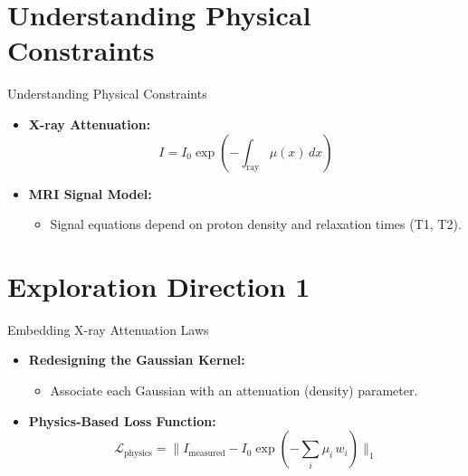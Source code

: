 \documentclass{beamer}
\begin{document}
\section{Understanding Physical Constraints}
\begin{frame}{Understanding Physical Constraints}
    \begin{itemize}
        \item \textbf{X-ray Attenuation:}
        \[
        I = I_0 \exp\left(-\int_{\text{ray}} \mu(x) \,dx\right)
        \]
        \item \textbf{MRI Signal Model:}
        \begin{itemize}
            \item Signal equations depend on proton density and relaxation times (T1, T2).
        \end{itemize}
    \end{itemize}
\end{frame}

\section{Exploration Direction 1}
\begin{frame}{Embedding X-ray Attenuation Laws}
    \begin{itemize}
        \item \textbf{Redesigning the Gaussian Kernel:}
        \begin{itemize}
            \item Associate each Gaussian with an attenuation (density) parameter.
        \end{itemize}
        \item \textbf{Physics-Based Loss Function:}
        \[
        \mathcal{L}_{\text{physics}} = \| I_{\text{measured}} - I_0 \exp(-\sum_{i} \mu_i \, w_i) \|_1
        \]
    \end{itemize}
\end{frame}

\end{document}
